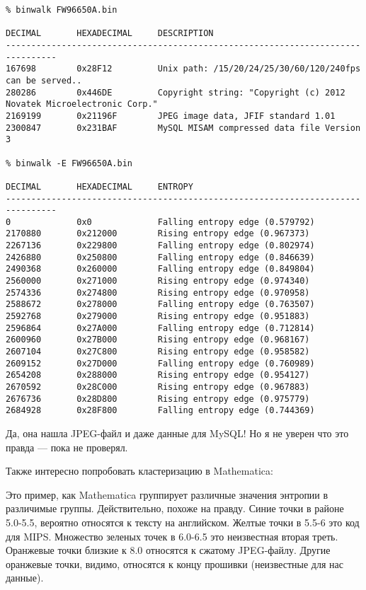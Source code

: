 \begin{lstlisting}
% binwalk FW96650A.bin 

DECIMAL       HEXADECIMAL     DESCRIPTION
--------------------------------------------------------------------------------
167698        0x28F12         Unix path: /15/20/24/25/30/60/120/240fps can be served..
280286        0x446DE         Copyright string: "Copyright (c) 2012 Novatek Microelectronic Corp."
2169199       0x21196F        JPEG image data, JFIF standard 1.01
2300847       0x231BAF        MySQL MISAM compressed data file Version 3

% binwalk -E FW96650A.bin 

DECIMAL       HEXADECIMAL     ENTROPY
--------------------------------------------------------------------------------
0             0x0             Falling entropy edge (0.579792)
2170880       0x212000        Rising entropy edge (0.967373)
2267136       0x229800        Falling entropy edge (0.802974)
2426880       0x250800        Falling entropy edge (0.846639)
2490368       0x260000        Falling entropy edge (0.849804)
2560000       0x271000        Rising entropy edge (0.974340)
2574336       0x274800        Rising entropy edge (0.970958)
2588672       0x278000        Falling entropy edge (0.763507)
2592768       0x279000        Rising entropy edge (0.951883)
2596864       0x27A000        Falling entropy edge (0.712814)
2600960       0x27B000        Rising entropy edge (0.968167)
2607104       0x27C800        Rising entropy edge (0.958582)
2609152       0x27D000        Falling entropy edge (0.760989)
2654208       0x288000        Rising entropy edge (0.954127)
2670592       0x28C000        Rising entropy edge (0.967883)
2676736       0x28D800        Rising entropy edge (0.975779)
2684928       0x28F800        Falling entropy edge (0.744369)
\end{lstlisting}

Да, она нашла JPEG-файл и даже данные для MySQL!
Но я не уверен что это правда --- пока не проверял.

Также интересно попробовать кластеризацию в Mathematica:



Это пример, как Mathematica группирует различные значения энтропии в различимые группы.
Действительно, похоже на правду. Синие точки в районе 5.0-5.5, вероятно относятся к тексту на английском.
Желтые точки в 5.5-6 это код для MIPS. Множество зеленых точек в 6.0-6.5 это неизвестная вторая треть.
Оранжевые точки близкие к 8.0 относятся к сжатому JPEG-файлу.
Другие оранжевые точки, видимо, относятся к концу прошивки (неизвестные для нас данные).

